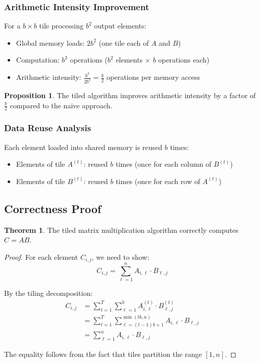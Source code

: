\documentclass{amsbook}
\theoremstyle{definition}
\newtheorem{theorem}{Theorem}[chapter]
\newtheorem{proposition}{Proposition}[chapter]
\begin{document}
\subsubsection{Arithmetic Intensity Improvement}

For a $b \times b$ tile processing $b^2$ output elements:
\begin{itemize}
\item Global memory loads: $2b^2$ (one tile each of $A$ and $B$)
\item Computation: $b^3$ operations ($b^2$ elements $\times$ $b$ operations each)
\item Arithmetic intensity: $\frac{b^3}{2b^2} = \frac{b}{2}$ operations per memory access
\end{itemize}

\begin{proposition}
The tiled algorithm improves arithmetic intensity by a factor of $\frac{b}{2}$ compared to the naive approach.
\end{proposition}

\subsubsection{Data Reuse Analysis}

Each element loaded into shared memory is reused $b$ times:
\begin{itemize}
\item Elements of tile $A^{(t)}$: reused $b$ times (once for each column of $B^{(t)}$)
\item Elements of tile $B^{(t)}$: reused $b$ times (once for each row of $A^{(t)}$)
\end{itemize}

\subsection{Correctness Proof}

\begin{theorem}
The tiled matrix multiplication algorithm correctly computes $C = AB$.
\end{theorem}

\begin{proof}
For each element $C_{i,j}$, we need to show:
\begin{equation}
C_{i,j} = \sum_{\ell=1}^{n} A_{i,\ell} \cdot B_{\ell,j}
\end{equation}

By the tiling decomposition:
\begin{align}
C_{i,j} &= \sum_{t=1}^{T} \sum_{\ell=1}^{b} A^{(t)}_{i,\ell} \cdot B^{(t)}_{\ell,j} \\
&= \sum_{t=1}^{T} \sum_{\ell=(t-1)b+1}^{\min(tb,n)} A_{i,\ell} \cdot B_{\ell,j} \\
&= \sum_{\ell=1}^{n} A_{i,\ell} \cdot B_{\ell,j}
\end{align}

The equality follows from the fact that tiles partition the range $[1,n]$.
\end{proof}
\end{document}
